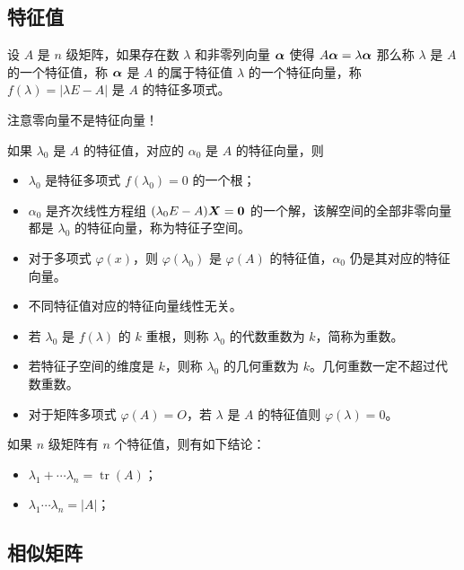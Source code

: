\subsection{特征值}

\begin{definition}
	设 $A$ 是 $n$ 级矩阵，如果存在数 $\lambda$ 和非零列向量 $\boldsymbol{\alpha}$ 使得 $A \boldsymbol{\alpha} = \lambda\boldsymbol{\alpha}$ 那么称 $\lambda$ 是 $A$ 的一个特征值，称 $\boldsymbol{\alpha}$ 是 $A$ 的属于特征值 $\lambda$ 的一个特征向量，称 $f(\lambda) = |\lambda E - A|$ 是 $A$ 的特征多项式。
\end{definition}

\begin{note}
	注意零向量不是特征向量！
\end{note}

如果 $\lambda_0$ 是 $A$ 的特征值，对应的 $\alpha_0$ 是 $A$ 的特征向量，则
\begin{itemize}
	\item $\lambda_0$ 是特征多项式 $f(\lambda_0) = 0$ 的一个根；
	\item $\alpha_0$ 是齐次线性方程组 $(\lambda_0 E - A) \boldsymbol{X} = \boldsymbol{0}$ 的一个解，该解空间的全部非零向量都是 $\lambda_0$ 的特征向量，称为特征子空间。
	\item 对于多项式 $\varphi(x)$，则 $\varphi(\lambda_0)$ 是 $\varphi(A)$ 的特征值，$\alpha_0$ 仍是其对应的特征向量。
	\item 不同特征值对应的特征向量线性无关。
	\item 若 $\lambda_0$ 是 $f(\lambda)$ 的 $k$ 重根，则称 $\lambda_0$ 的代数重数为 $k$，简称为重数。
	\item 若特征子空间的维度是 $k$，则称 $\lambda_0$ 的几何重数为 $k$。几何重数一定不超过代数重数。
	\item 对于矩阵多项式 $\varphi(A) = O$，若 $\lambda$ 是 $A$ 的特征值则 $\varphi(\lambda) = 0$。
\end{itemize}

如果 $n$ 级矩阵有 $n$ 个特征值，则有如下结论：
\begin{itemize}
	\item $\lambda_1 + \cdots \lambda_n = \operatorname{tr}(A)$；
	\item $\lambda_1 \cdots \lambda_n = |A|$；
\end{itemize}

\subsection{相似矩阵}


